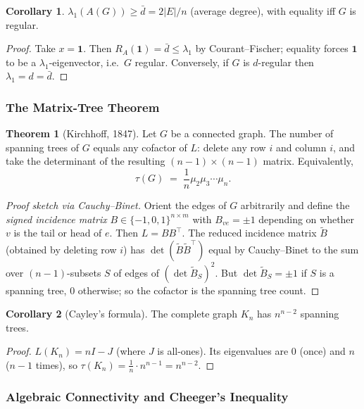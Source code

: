 \documentclass{article}
\theoremstyle{definition}
\newtheorem{theorem}{Theorem}
\newtheorem{corollary}{Corollary}
\begin{document}
\begin{corollary}
$\lambda_1(A(G)) \ge \bar d = 2|E|/n$ (average degree), with equality
iff $G$ is regular.
\end{corollary}

\begin{proof}
Take $x = \mathbf 1$. Then $R_A(\mathbf 1) = \bar d \le \lambda_1$
by Courant--Fischer; equality forces $\mathbf 1$ to be a
$\lambda_1$-eigenvector, i.e.\ $G$ regular. Conversely, if $G$ is
$d$-regular then $\lambda_1 = d = \bar d$.
\end{proof}

\subsubsection{The Matrix-Tree Theorem}

\begin{theorem}[Kirchhoff, 1847]\label{thm:matrixtree}
Let $G$ be a connected graph. The number of spanning trees of $G$
equals any cofactor of $L$: delete any row $i$ and column $i$, and
take the determinant of the resulting $(n - 1) \times (n - 1)$ matrix.
Equivalently,
\[
  \tau(G) \;=\; \frac{1}{n} \mu_2 \mu_3 \cdots \mu_n.
\]
\end{theorem}

\begin{proof}[Proof sketch via Cauchy--Binet]
Orient the edges of $G$ arbitrarily and define the \emph{signed
incidence matrix} $B \in \{-1, 0, 1\}^{n \times m}$ with
$B_{ve} = \pm 1$ depending on whether $v$ is the tail or head of $e$.
Then $L = B B^\top$. The reduced incidence matrix $\tilde B$
(obtained by deleting row $i$) has $\det(\tilde B \tilde B^\top)$
equal by Cauchy--Binet to the sum over $(n - 1)$-subsets $S$ of
edges of $(\det \tilde B_S)^2$. But $\det \tilde B_S = \pm 1$ if $S$
is a spanning tree, $0$ otherwise; so the cofactor is the spanning
tree count.
\end{proof}

\begin{corollary}[Cayley's formula]
The complete graph $K_n$ has $n^{n - 2}$ spanning trees.
\end{corollary}

\begin{proof}
$L(K_n) = n I - J$ (where $J$ is all-ones). Its eigenvalues are $0$
(once) and $n$ ($n - 1$ times), so
$\tau(K_n) = \frac{1}{n} \cdot n^{n - 1} = n^{n - 2}$.
\end{proof}

\subsubsection{Algebraic Connectivity and Cheeger's Inequality}
\end{document}
